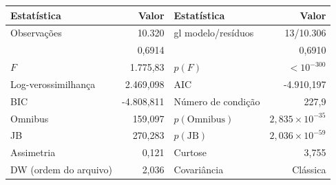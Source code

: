 \begin{tabular}{lrlr}
\toprule
Estatística & Valor & Estatística & Valor \\
\midrule
Observações & 10.320 & gl modelo/resíduos & 13/10.306 \\
\Rtwo{} & 0,6914 & \Rtwoadj{} & 0,6910 \\
$F$ & 1.775,83 & $p(F)$ & $<10^{-300}$ \\
Log-verossimilhança & 2.469,098 & AIC & -4.910,197 \\
BIC & -4.808,811 & Número de condição & 227,9 \\
Omnibus & 159,097 & $p(\text{Omnibus})$ & $2{,}835\times10^{-35}$ \\
JB & 270,283 & $p(\text{JB})$ & $2{,}036\times10^{-59}$ \\
Assimetria & 0,121 & Curtose & 3,755 \\
DW (ordem do arquivo) & 2,036 & Covariância & Clássica \\
\bottomrule
\end{tabular}
